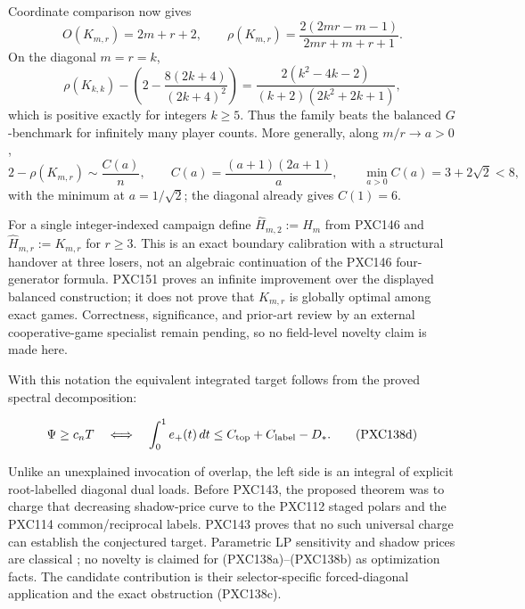 \documentclass[11pt]{article}
\begin{document}
Coordinate comparison now gives
\begin{equation}
 O(K_{m,r})=2m+r+2,\qquad
 \rho(K_{m,r})=
 \frac{2(2mr-m-1)}{2mr+m+r+1}.                     \tag{PXC151g}
\end{equation}
On the diagonal \(m=r=k\),
\begin{equation}
 \rho(K_{k,k})-\left(2-\frac{8(2k+4)}{(2k+4)^2}\right)
 =\frac{2(k^2-4k-2)}{(k+2)(2k^2+2k+1)},             \tag{PXC151h}
\end{equation}
which is positive exactly for integers \(k\ge5\).  Thus the family beats
the balanced \(G\)-benchmark for infinitely many player counts.  More
generally, along \(m/r\to a>0\),
\begin{equation}
 2-\rho(K_{m,r})\sim\frac{C(a)}n,\qquad
 C(a)=\frac{(a+1)(2a+1)}a,\qquad
 \min_{a>0}C(a)=3+2\sqrt2<8,                        \tag{PXC151i}
\end{equation}
with the minimum at \(a=1/\sqrt2\); the diagonal already gives \(C(1)=6\).

For a single integer-indexed campaign define
\(\widehat H_{m,2}:=H_m\) from PXC146 and
\(\widehat H_{m,r}:=K_{m,r}\) for \(r\ge3\).  This is an exact boundary
calibration with a structural handover at three losers, not an algebraic
continuation of the PXC146 four-generator formula.  PXC151 proves an
infinite improvement over the displayed balanced construction; it does not
prove that \(K_{m,r}\) is globally optimal among exact games.  Correctness,
significance, and prior-art review by an external cooperative-game
specialist remain pending, so no field-level novelty claim is made here.

With this notation the equivalent integrated target follows from the proved
spectral decomposition:

\begin{equation}
 \Psi\ge c_nT
 \quad\Longleftrightarrow\quad
 \int_0^1e_+(t)\,dt
 \le C_{\rm top}+C_{\rm label}-D_*.                     \tag{PXC138d}
\end{equation}

Unlike an unexplained invocation of overlap, the left side is an integral
of explicit root-labelled diagonal dual loads.  Before PXC143, the proposed
theorem was to charge that decreasing shadow-price curve to the PXC112 staged
polars and the PXC114 common/reciprocal labels.  PXC143 proves that no such
universal charge can establish the conjectured target.  Parametric LP sensitivity and shadow
prices are classical \citep{AdlerMonteiro1992}; no novelty is claimed for
(PXC138a)--(PXC138b) as optimization facts.  The candidate contribution is
their selector-specific forced-diagonal application and the exact
obstruction (PXC138c).
\end{document}
